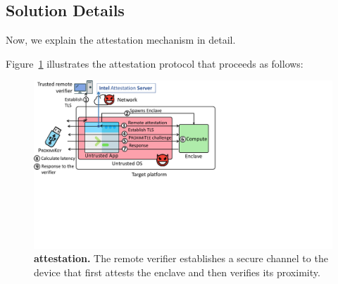 \subsection{Solution Details}
\label{sec:systemDesign}


Now, we explain the \name attestation mechanism in detail.



Figure~\ref{fig:systemSetUp} illustrates the attestation protocol that proceeds as follows:


\begin{figure}[t]
 \centering
  \includegraphics[trim={0 8cm 13.2cm 0},clip,width=\linewidth]{chapters/ProximiTEE/images_new/distance_bound.pdf}
 \caption[\name attestation]{\textbf{\name attestation.} The remote verifier establishes a secure channel to the \device device that first attests the enclave and then verifies its proximity.}
 	\label{fig:systemSetUp}
\end{figure}


